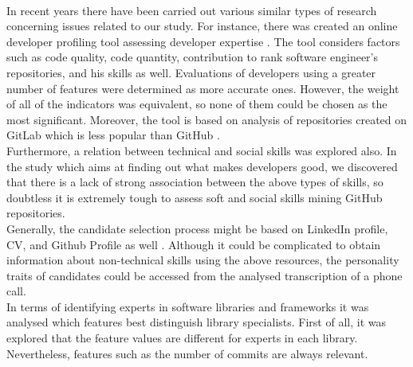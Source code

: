 \\In recent years there have been carried out various similar types of research concerning issues related to our study. For instance, there was created an online developer profiling tool assessing developer expertise \cite{GitLabProfilingTool}. The tool considers factors such as code quality, code quantity, contribution to rank software engineer’s repositories, and his skills as well. Evaluations of developers using a greater number of features were determined as more accurate ones. However, the weight of all of the indicators was equivalent, so none of them could be chosen as the most significant. Moreover, the tool is based on analysis of repositories created on GitLab which is less popular than GitHub \cite{GitLabvsGithub}.
\\Furthermore, a relation between technical and social skills \cite{WhatMakesGoodDev} was explored also. In the study which aims at finding out what makes developers good, we discovered that there is a lack of strong association between the above types of skills, so doubtless it is extremely tough to assess soft and social skills mining GitHub repositories.
\\Generally, the candidate selection process might be based on LinkedIn profile, CV, and Github Profile as well \cite{CandidateSelection}. Although it could be complicated to obtain information about non-technical skills using the above resources, the personality traits of candidates could be accessed from the analysed transcription of a phone call.
\\In terms of identifying experts in software libraries and frameworks \cite{SoftwareLibraries} it was analysed which features best distinguish library specialists. First of all, it was explored that the feature values are different for experts in each library. Nevertheless, features such as the number of commits are always relevant.
